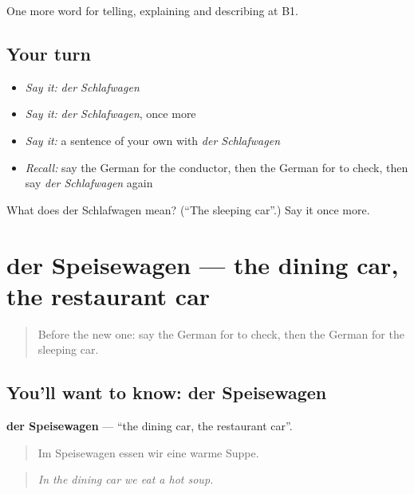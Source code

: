 \begin{grammarlens}[title={What you've built}]
One more word for telling, explaining and describing at B1.
\end{grammarlens}

\subsection*{Your turn}
\begin{itemize}
\raggedright
  \item \emph{Say it:} \emph{der Schlafwagen}
  \item \emph{Say it:} \emph{der Schlafwagen}, once more
  \item \emph{Say it:} a sentence of your own with \emph{der Schlafwagen}
  \item \emph{Recall:} say the German for the conductor, then the German for to check, then say \emph{der Schlafwagen} again
\end{itemize}

\begin{tcolorbox}[breakable,colback=teal!4,colframe=teal!35!black,title={Before you move on}]
What does der Schlafwagen mean? (\textquotedblleft{}The sleeping car\textquotedblright{}.) Say it once more.
\end{tcolorbox}
\section[der Speisewagen]{der Speisewagen — the dining car, the restaurant car}

\label{lesson:GE-C413-speisewagen}



\begin{quote}
Before the new one: say the German for to check, then the German for the sleeping car.
\end{quote}

\subsection*{You'll want to know: der Speisewagen}
\textbf{der Speisewagen} — \textquotedblleft{}the dining car, the restaurant car\textquotedblright{}.

\begin{quote}
Im Speisewagen essen wir eine warme Suppe.
\end{quote}

\begin{quote}
\emph{In the dining car we eat a hot soup.}
\end{quote}

